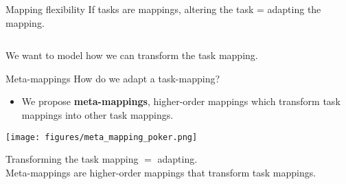 \documentclass{beamer}
\begin{document}
\begin{frame}{Mapping flexibility}
If tasks are mappings, altering the task = adapting the mapping. 
\begin{columns}
\begin{column}{0.5\textwidth}
\vspace{2em}

\end{column}
\begin{column}{0.5\textwidth}
\vspace{2em}
\end{column}
\end{columns}
\end{frame}

\begin{frame}[standout]
We want to model how we can transform the task mapping.
\end{frame}

\begin{frame}{Meta-mappings}
How do we adapt a task-mapping?
\begin{itemize}
\item We propose \textbf{meta-mappings}, higher-order mappings which transform task mappings into other task mappings.
\end{itemize}
\texttt{[image: figures/meta\_mapping\_poker.png]}
\end{frame}

\begin{frame}[standout]
Transforming the task mapping \(=\) adapting. \\[1em]
Meta-mappings are higher-order mappings that transform task mappings.
\end{frame}
\end{document}
